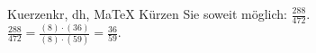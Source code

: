 \begin{MAufgabe}{Kuerzen}{kr, dh, MaTeX}
K\"urzen Sie soweit m\"oglich: $\frac{288}{472}$.\\ 
\ifLsg\MLoesung
\quad $\frac{288}{472}=\frac{(8)\cdot(36)}{(8)\cdot(59)}=\frac{36}{59}$.\else\relax\fi
 \end{MAufgabe}
